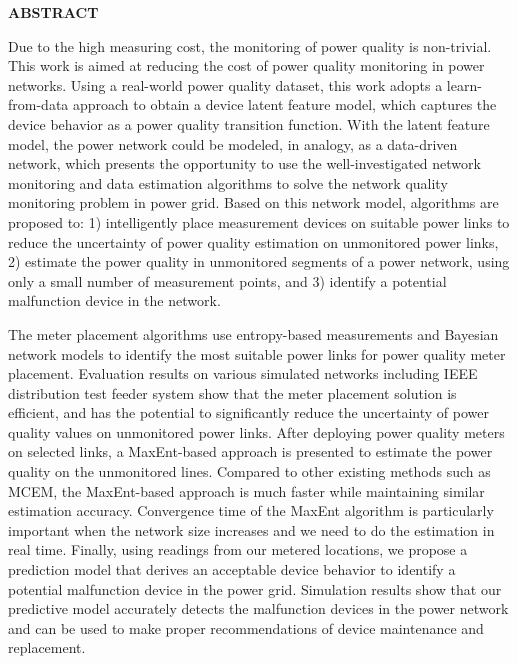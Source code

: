 \newpage
{}


\begin{center}
\textbf{ABSTRACT}
\end{center}

Due to the high measuring cost, the monitoring of power quality is non-trivial. This work is aimed at reducing the cost of power quality monitoring in power networks. Using a real-world power quality dataset, this work adopts a learn-from-data approach to obtain a device latent feature model, which captures the device behavior as a power quality transition function. With the latent feature model, the power network could be modeled, in analogy, as a data-driven network, which presents the opportunity to use the well-investigated network monitoring and data estimation algorithms to solve the network quality monitoring problem in power grid. Based on this network model, algorithms are proposed to: 1) intelligently place measurement devices on suitable power links to reduce the uncertainty of power quality estimation on unmonitored power links, 2) estimate the power quality in unmonitored segments of a power network, using only a small number of measurement points, and 3) identify a potential malfunction device in the network.

The meter placement algorithms use entropy-based measurements and Bayesian network models to identify the most suitable power links for power quality meter placement. Evaluation results on various simulated networks including IEEE distribution test feeder system show that the meter placement solution is efficient, and has the potential to significantly reduce the uncertainty of power quality values on unmonitored power links. After deploying power quality meters on selected links, a MaxEnt-based approach is presented to estimate the power quality on the unmonitored lines. Compared to other existing methods such as MCEM, the MaxEnt-based approach is much faster while maintaining similar estimation accuracy. Convergence time of the MaxEnt algorithm is particularly important when the network size increases and we need to do the estimation in real time. Finally, using readings from our metered locations, we propose a prediction model that derives an acceptable device behavior to identify a potential malfunction device in the power grid. Simulation results show that our predictive model accurately detects the malfunction devices in the power network and can be used to make proper recommendations of device maintenance and replacement.